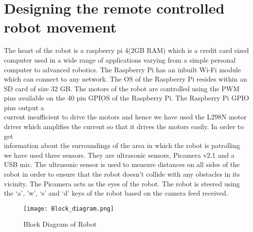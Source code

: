 \section{Designing the remote controlled robot movement}
The heart of the robot is a raspberry pi 4(2GB RAM) which is a credit card sized computer used in a wide range of applications varying from a simple personal \\computer to advanced robotics.  The Raspberry Pi has an inbuilt Wi-Fi module which can connect to any network. The OS of the Raspberry Pi resides within an SD card of size 32 GB. The motors of the robot are controlled using the PWM pins available on the 40 pin GPIOS of the Raspberry Pi. The Raspberry Pi GPIO pins output a \\current insufficient to drive the motors and hence we have used the L298N motor driver which amplifies the current so that it drives the motors easily. In order to get \\information about the surroundings of the area in which the robot is patrolling we have used three sensors. They are ultrasonic sensors, Picamera v2.1 and a USB mic. The ultrasonic sensor is used to measure distances on all sides of the robot in order to ensure that the robot doesn’t collide with any obstacles in its vicinity. The Picamera acts as the eyes of the robot. The robot is steered using the ‘a’, ’w’, ‘s’ and ‘d’ keys of the robot based on the camera feed received.
\vspace{0.1in}
\begin{figure}[h]
\centering
\texttt{[image: Block\_diagram.png]}
\caption{Block Diagram of Robot}
\end{figure}
